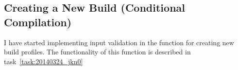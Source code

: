 \subsection{Creating a New Build (Conditional Compilation)}
\label{task:20140329_jkn0}
I have started implementing input validation in the function for creating new build profiles. The functionality of this function is described in task~\ref{task:20140324_jkn0}
